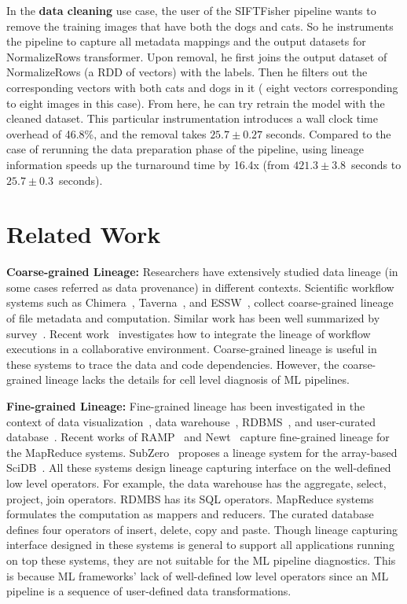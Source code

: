 \documentclass{sig-alternate}
\begin{document}
In the {\bf data cleaning} use case, the user of the SIFTFisher pipeline wants to remove the training images that have both the dogs and cats.
So he instruments the pipeline to capture all metadata mappings and the output datasets for NormalizeRows transformer. 
Upon removal, he first joins the output dataset of NormalizeRows (a RDD of vectors) with the labels.
Then he filters out the corresponding vectors with both cats and dogs in it ( eight vectors corresponding to eight images in this case). 
From here, he can try retrain the model with the cleaned dataset. 
This particular instrumentation introduces a wall clock time overhead of 46.8\%, and the removal takes $25.7\pm0.27$ seconds.
Compared to the case of rerunning the data preparation phase of the pipeline, using lineage information speeds up the turnaround
time by 16.4x (from $421.3\pm3.8$~seconds to $25.7\pm0.3$~seconds). 


\section{Related Work}
\label{sec:Related}
{\bf Coarse-grained Lineage:} Researchers have extensively studied data lineage (in some cases referred as data provenance) in different contexts.
Scientific workflow systems such as  Chimera~\cite{foster02}, Taverna~\cite{oinn02}, and ESSW~\cite{frew01}, 
collect coarse-grained lineage of file metadata and computation. 
Similar work has been well summarized by survey~\cite{simmhan05, freire08, bose05}.
Recent work~\cite{altintas10} investigates how to integrate the lineage of workflow executions
in a collaborative environment. Coarse-grained lineage is useful in these systems to trace the data and code dependencies.
However, the coarse-grained lineage lacks the details for cell level diagnosis of ML pipelines.

{\bf Fine-grained Lineage:} Fine-grained lineage has been investigated in the context of data visualization~\cite{stonebraker93, woodruff97},  
data warehouse~\cite{cui00, cui03}, RDBMS~\cite{widom04}, and user-curated database~\cite{buneman06}.
Recent works of RAMP~\cite{ikeda11, park11} and Newt~\cite{logothetis13} capture fine-grained lineage for the MapReduce
systems. SubZero~\cite{wu13} proposes a lineage system for the array-based SciDB~\cite{brown10}.
All these systems design lineage capturing interface on the well-defined low level operators.
For example, the data warehouse has the aggregate, select, project, join operators. 
RDMBS has its SQL operators. MapReduce systems formulates the computation as mappers and reducers.
The curated database defines four operators of insert, delete, copy and paste.
Though lineage capturing interface designed in these systems is general to support all applications running on top these systems,
they are not suitable for the ML pipeline diagnostics.
This is because ML frameworks' lack of well-defined low level operators since an ML pipeline is a sequence of user-defined 
data transformations.
\end{document}
